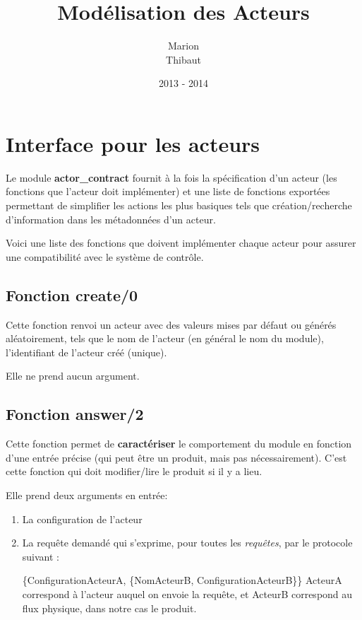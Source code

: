 \documentclass[12pt,a4paper]{article}
\title{\textbf{Modélisation des Acteurs}}
\author{Marion \familyname{Ly} \\ Thibaut \familyname{Smith}}
\date{2013 - 2014}
\begin{document}
	\maketitle

	\section{Interface pour les acteurs}

	Le module \textbf{actor\_contract} fournit à la fois la spécification d'un 
	acteur (les fonctions que l'acteur doit implémenter) et une liste de 
	fonctions exportées permettant de simplifier les actions les plus basiques 
	tels que création/recherche d'information dans les métadonnées d'un acteur.

	Voici une liste des fonctions que doivent implémenter chaque acteur pour 
	assurer une compatibilité avec le système de contrôle. 


	\subsection*{Fonction create/0}
		Cette fonction renvoi un acteur avec des valeurs mises par défaut ou
		générés aléatoirement, tels que le nom de l'acteur (en général le nom
		du module), l'identifiant de l'acteur créé (unique).

		Elle ne prend aucun argument.

	\subsection*{Fonction answer/2}
		Cette fonction permet de \textbf{caractériser} le comportement du 
		module en fonction d'une entrée précise (qui peut être un produit, mais
		pas nécessairement). C'est cette fonction qui doit modifier/lire le 
		produit si il y a lieu.

		Elle prend deux arguments en entrée:

		\begin{enumerate}
			\item La configuration de l'acteur
			\item La requête demandé qui s'exprime, pour toutes les 
			\textit{requêtes}, par le protocole suivant :

				\{ConfigurationActeurA, 
				\{NomActeurB, ConfigurationActeurB\}\}
				ActeurA correspond à l'acteur auquel on envoie la requête, et 
				ActeurB correspond au flux physique, dans notre cas le produit.
		\end{enumerate}
\end{document}
